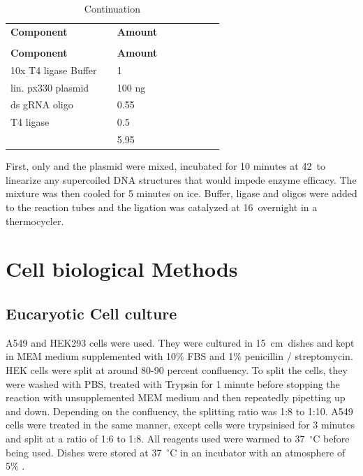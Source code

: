 \begin{longtable}[ht]{L{0.45\linewidth} R{0.45\linewidth}}
\caption{ligation reaction pipetting scheme}
\label{ligation reaction pipetting scheme}
\\
\toprule
{}
\textbf{Component}& \textbf{Amount}\\                           
\midrule
\endfirsthead
{}
\caption[]{Continuation}
\\
\midrule
{}
\textbf{Component}& \textbf{Amount}\\ 
\midrule
\endhead
\bottomrule
\endfoot
10x T4 ligase Buffer & 1 \ul \\
lin. px330 plasmid & 100 ng \\
ds gRNA oligo & 0.55 \ul \\
T4 ligase & 0.5 \ul \\
 & 5.95 \ul \\
\end{longtable}

First, only  and the plasmid were mixed, incubated for 10 minutes at 42\C \ to linearize any supercoiled DNA structures that would impede enzyme efficacy. The mixture was then cooled for 5 minutes on ice. Buffer, ligase and oligos were added to the reaction tubes and the ligation was catalyzed at 16\C \ overnight in a thermocycler. 

\newpage

\section{Cell biological Methods}

\subsection{Eucaryotic Cell culture}
\label{Cell culture}

A549 and HEK293 cells were used. They were cultured in \mbox{15 cm dishes} and kept in MEM medium supplemented with 10\% FBS and 1\% penicillin / streptomycin. HEK cells were split at around 80-90 percent confluency. To split the cells, they were washed with PBS, treated with Trypsin for 1 minute before stopping the reaction with unsupplemented MEM medium and then repeatedly pipetting up and down. Depending on the confluency, the splitting ratio was 1:8 to 1:10. A549 cells were treated in the same manner, except cells were trypsinised for 3 minutes and split at a ratio of 1:6 to 1:8. All reagents used were warmed to 37\ \(^\circ\mathrm{C}\) before being used. Dishes were stored at 37\ \(^\circ\mathrm{C}\) in an incubator with an atmosphere of 5\% . 


